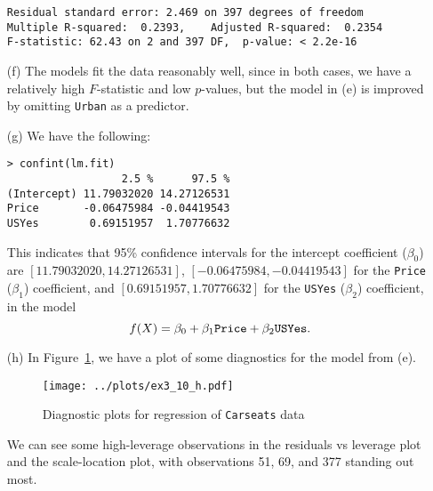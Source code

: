 \begin{itemize}
\begin{verbatim}
Residual standard error: 2.469 on 397 degrees of freedom
Multiple R-squared:  0.2393,    Adjusted R-squared:  0.2354 
F-statistic: 62.43 on 2 and 397 DF,  p-value: < 2.2e-16
        \end{verbatim}\normalsize
    \item[(f)] The models fit the data reasonably well, since in both cases, we 
        have a relatively high $F$-statistic and low $p$-values, but the model 
        in (e) is improved by omitting \verb|Urban| as a predictor.
    \item[(g)] We have the following:
        \scriptsize\begin{verbatim}
> confint(lm.fit)
                  2.5 %      97.5 %
(Intercept) 11.79032020 14.27126531
Price       -0.06475984 -0.04419543
USYes        0.69151957  1.70776632
        \end{verbatim}\normalsize
        This indicates that 95\% confidence intervals for the intercept coefficient 
        ($\beta_0$) are $[11.79032020,14.27126531]$, $[-0.06475984, -0.04419543]$ 
        for the \verb|Price| ($\beta_1$) coefficient, and $[0.69151957, 1.70776632]$ 
        for the \verb|USYes| ($\beta_2$) coefficient, in the model
        \[
            f(X) = \beta_0 + \beta_1\verb|Price| + \beta_2\verb|USYes|.
        \]
    \item[(h)] In Figure~\ref{fig3_10diag}, we have a plot of some diagnostics for 
        the model from (e).
        \begin{figure}[!ht]
            \texttt{[image: ../plots/ex3\_10\_h.pdf]}
            \caption{Diagnostic plots for regression of \texttt{Carseats} data 
                \label{fig3_10diag}}
        \end{figure}
        We can see some high-leverage observations in the residuals vs leverage plot 
        and the scale-location plot, with observations 51, 69, and 377 standing out most.
\end{itemize}

